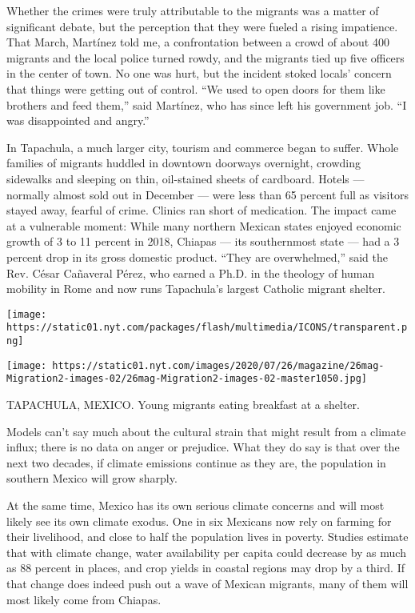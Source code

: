 Whether the crimes were truly attributable to the migrants was a matter
of significant debate, but the perception that they were fueled a rising
impatience. That March, Martínez told me, a confrontation between a
crowd of about 400 migrants and the local police turned rowdy, and the
migrants tied up five officers in the center of town. No one was hurt,
but the incident stoked locals' concern that things were getting out of
control. ``We used to open doors for them like brothers and feed them,''
said Martínez, who has since left his government job. ``I was
disappointed and angry.''

In Tapachula, a much larger city, tourism and commerce began to suffer.
Whole families of migrants huddled in downtown doorways overnight,
crowding sidewalks and sleeping on thin, oil-stained sheets of
cardboard. Hotels --- normally almost sold out in December --- were less
than 65 percent full as visitors stayed away, fearful of crime. Clinics
ran short of medication. The impact came at a vulnerable moment: While
many northern Mexican states enjoyed economic growth of 3 to 11 percent
in 2018, Chiapas --- its southernmost state --- had a 3 percent drop in
its gross domestic product. ``They are overwhelmed,'' said the Rev.
César Cañaveral Pérez, who earned a Ph.D. in the theology of human
mobility in Rome and now runs Tapachula's largest Catholic migrant
shelter.

\texttt{[image: https://static01.nyt.com/packages/flash/multimedia/ICONS/transparent.png]}

\texttt{[image: https://static01.nyt.com/images/2020/07/26/magazine/26mag-Migration2-images-02/26mag-Migration2-images-02-master1050.jpg]}

TAPACHULA, MEXICO. Young migrants eating breakfast at a shelter.

Models can't say much about the cultural strain that might result from a
climate influx; there is no data on anger or prejudice. What they do say
is that over the next two decades, if climate emissions continue as they
are, the population in southern Mexico will grow sharply.

At the same time, Mexico has its own serious climate concerns and will
most likely see its own climate exodus. One in six Mexicans now rely on
farming for their livelihood, and close to half the population lives in
poverty. Studies estimate that with climate change, water availability
per capita could decrease by as much as 88 percent in places, and crop
yields in coastal regions may drop by a third. If that change does
indeed push out a wave of Mexican migrants, many of them will most
likely come from Chiapas.

